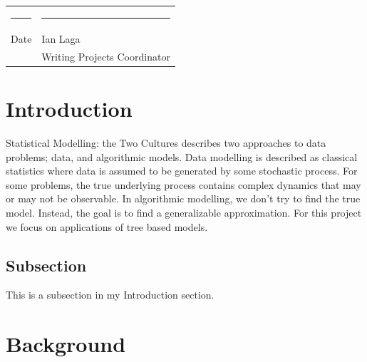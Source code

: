\documentclass[
  12pt,
  letterpaper,
  DIV=11,
  numbers=noendperiod]{scrartcl}
\newcommand{\wprojcoord}{Ian Laga}  %
\renewcommand*\contentsname{Table of contents}
\newcommand\contentsname{Table of contents}
\begin{document}
\begin{singlespace}
\begin{titlepage}
\vspace{1cm}

\begin{center}
\begin{tabular}{ll}
\rule{2.75in}{.03in} & \rule{2.75in}{.03in} \\
Date& \wprojcoord \\
& Writing Projects Coordinator \\
\end{tabular}
\end{center}

\end{titlepage}
\end{singlespace}


\vspace{2.in}
\begin{abstract}

\end{abstract}


\newpage


\renewcommand*\contentsname{Table of contents}
{
\hypersetup{linkcolor=}
\setcounter{tocdepth}{3}
\tableofcontents
}

\newpage

\section{Introduction}\label{sec:intro}

Statistical Modelling: the Two Cultures \citep{Breiman_2001} describes
two approaches to data problems; data, and algorithmic models. Data
modelling is described as classical statistics where data is assumed to
be generated by some stochastic process. For some problems, the true
underlying process contains complex dynamics that may or may not be
observable. In algorithmic modelling, we don't try to find the true
model. Instead, the goal is to find a generalizable approximation. For
this project we focus on applications of tree based models.

\subsection{Subsection}\label{subsection}

This is a subsection in my Introduction section.

\section{Background}\label{sec:background}
\end{document}
